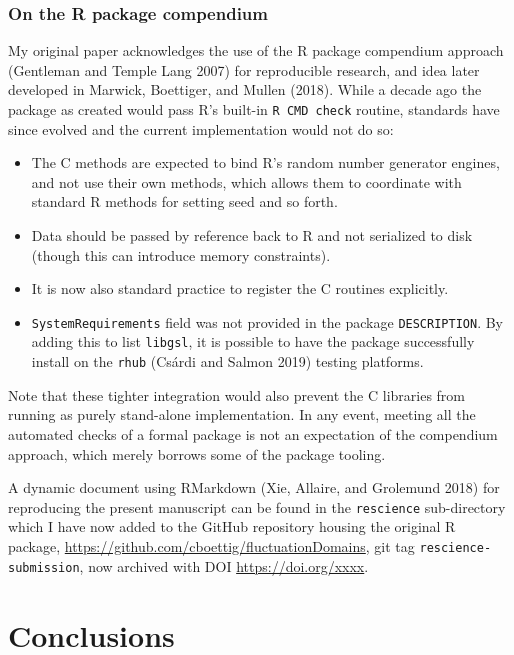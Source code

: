 \documentclass[
]{rescience}
\providecommand{\tightlist}{%
  \setlength{\itemsep}{0pt}\setlength{\parskip}{0pt}}
\begin{document}
\hypertarget{on-the-r-package-compendium}{%
\subsubsection{On the R package
compendium}\label{on-the-r-package-compendium}}

My original paper acknowledges the use of the R package compendium
approach (Gentleman and Temple Lang 2007) for reproducible research, and
idea later developed in Marwick, Boettiger, and Mullen (2018). While a
decade ago the package as created would pass R's built-in
\texttt{R\ CMD\ check} routine, standards have since evolved and the
current implementation would not do so:

\begin{itemize}
\tightlist
\item
  The C methods are expected to bind R's random number generator
  engines, and not use their own methods, which allows them to
  coordinate with standard R methods for setting seed and so forth.
\item
  Data should be passed by reference back to R and not serialized to
  disk (though this can introduce memory constraints).
\item
  It is now also standard practice to register the C routines
  explicitly.
\item
  \texttt{SystemRequirements} field was not provided in the package
  \texttt{DESCRIPTION}. By adding this to list \texttt{libgsl}, it is
  possible to have the package successfully install on the \texttt{rhub}
  (Csárdi and Salmon 2019) testing platforms.
\end{itemize}

Note that these tighter integration would also prevent the C libraries
from running as purely stand-alone implementation. In any event, meeting
all the automated checks of a formal package is not an expectation of
the compendium approach, which merely borrows some of the package
tooling.

A dynamic document using RMarkdown (Xie, Allaire, and Grolemund 2018)
for reproducing the present manuscript can be found in the
\texttt{rescience} sub-directory which I have now added to the GitHub
repository housing the original R package,
\url{https://github.com/cboettig/fluctuationDomains}, git tag
\texttt{rescience-submission}, now archived with DOI
\url{https://doi.org/xxxx}.

\hypertarget{conclusions}{%
\section{Conclusions}\label{conclusions}}
\end{document}
